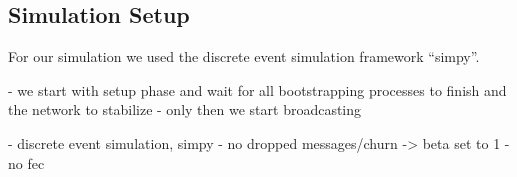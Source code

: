 \subsection{Simulation Setup}
For our simulation we used the discrete event simulation framework ``simpy''.

- we start with setup phase and wait for all bootstrapping processes to finish and the network to stabilize
- only then we start broadcasting

- discrete event simulation, simpy
- no dropped messages/churn -> beta set to 1
- no fec